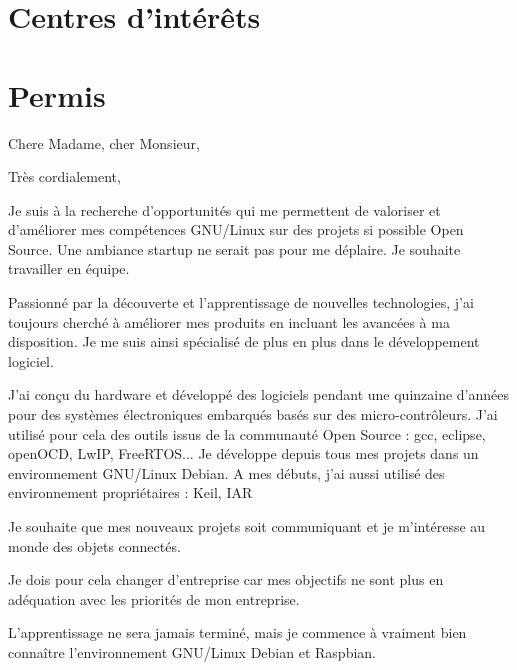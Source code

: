 \documentclass[11pt,a4paper,sans]{moderncv}   %
\begin{document}
\section{Centres d'intérêts}


\renewcommand{\listitemsymbol}{-~}            %

\section{Permis}


\clearpage
\date{23 janvier 2017}
\opening{Chere Madame, cher Monsieur,}
\closing{Très cordialement,}
\makelettertitle

    Je suis à la recherche d'opportunités qui me permettent de valoriser et d'améliorer mes compétences GNU/Linux sur des projets si possible Open Source. Une ambiance startup ne serait pas pour me déplaire. Je souhaite travailler en équipe.
    
    Passionné par la découverte et l'apprentissage de nouvelles technologies, j'ai toujours cherché à améliorer mes produits en incluant les avancées à ma disposition. Je me suis ainsi spécialisé de plus en plus dans le développement logiciel.

    J'ai conçu du hardware et développé des logiciels pendant une quinzaine d'années pour des systèmes électroniques embarqués basés sur des micro-contrôleurs. J'ai utilisé pour cela des outils issus de la communauté Open Source : gcc, eclipse, openOCD, LwIP, FreeRTOS... Je développe depuis tous mes projets dans un environnement GNU/Linux Debian. A mes débuts, j'ai aussi utilisé des environnement propriétaires : Keil, IAR

    Je souhaite que mes nouveaux projets soit communiquant et je m'intéresse au monde des objets connectés.
    
    Je dois pour cela changer d'entreprise car mes objectifs ne sont plus en adéquation avec les priorités de mon entreprise. 

    L'apprentissage ne sera jamais terminé, mais je commence à vraiment bien connaître l'environnement GNU/Linux Debian et Raspbian.

\makeletterclosing
\end{document}
